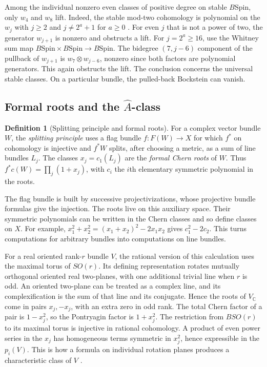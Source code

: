 \documentclass[11pt]{article}
\theoremstyle{definition}
\newtheorem{defn}{Definition}[section]
\newcommand{\Ahat}{\widehat A}
\newcommand{\Spin}{\mathrm{Spin}}
\begin{document}
Among the individual nonzero even classes of positive degree on stable \(B\Spin\), only \(w_4\) and \(w_8\) lift. Indeed, the stable mod-two cohomology is polynomial on the \(w_j\) with \(j\ge2\) and \(j\ne 2^a+1\) for \(a\ge0\) \cite{AM}. For even \(j\) that is not a power of two, the generator \(w_{j+1}\) is nonzero and obstructs a lift. For \(j=2^a\ge16\), use the Whitney sum map \(B\Spin\times B\Spin\to B\Spin\). The bidegree \((7,j-6)\) component of the pullback of \(w_{j+1}\) is \(w_7\otimes w_{j-6}\), nonzero since both factors are polynomial generators. This again obstructs the lift. The conclusion concerns the universal stable classes. On a particular bundle, the pulled-back Bockstein can vanish.

\subsection{Formal roots and the \texorpdfstring{\(\Ahat{}\)}{A-hat}-class}\label{sec:ahat}
\begin{defn}[Splitting principle and formal roots]
For a complex vector bundle \(W\), the \emph{splitting principle} uses a flag bundle \(f:F(W)\to X\) for which \(f^*\) on cohomology is injective and \(f^*W\) splits, after choosing a metric, as a sum of line bundles \(L_j\). The classes \(x_j=c_1(L_j)\) are the \emph{formal Chern roots} of \(W\). Thus \(f^*c(W)=\prod_j(1+x_j)\), with \(c_i\) the \(i\)th elementary symmetric polynomial in the roots.
\end{defn}
The flag bundle is built by successive projectivizations, whose projective bundle formulas give the injection. The roots live on this auxiliary space. Their symmetric polynomials can be written in the Chern classes and so define classes on \(X\). For example, \(x_1^2+x_2^2=(x_1+x_2)^2-2x_1x_2\) gives \(c_1^2-2c_2\). This turns computations for arbitrary bundles into computations on line bundles.

For a real oriented rank-\(r\) bundle \(V\), the rational version of this calculation uses the maximal torus of \(SO(r)\). Its defining representation rotates mutually orthogonal oriented real two-planes, with one additional trivial line when \(r\) is odd. An oriented two-plane can be treated as a complex line, and its complexification is the sum of that line and its conjugate. Hence the roots of \(V_{\mathbb C}\) come in pairs \(x_j,-x_j\), with an extra zero in odd rank. The total Chern factor of a pair is \(1-x_j^2\), so the Pontryagin factor is \(1+x_j^2\). The restriction from \(BSO(r)\) to its maximal torus is injective in rational cohomology. A product of even power series in the \(x_j\) has homogeneous terms symmetric in \(x_j^2\), hence expressible in the \(p_i(V)\). This is how a formula on individual rotation planes produces a characteristic class of \(V\) \cite{MS}.
\end{document}
